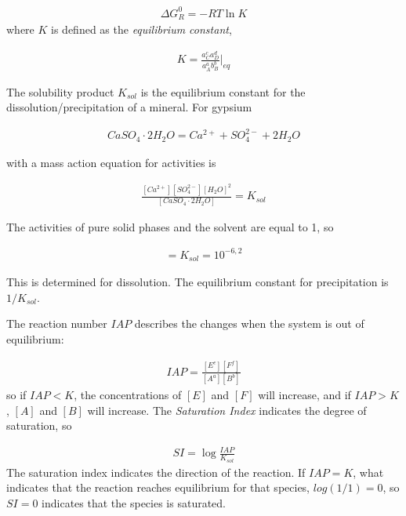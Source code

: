 \documentclass[11pt,twoside]{report}
\begin{document}
\begin{align}
    \Delta G_{R}^{0} = -RT \ln K
\end{align}
where $K$ is defined as the \textit{equilibrium constant}, 

\begin{align}
   K = \frac{a_{C}^{c}a_{D}^{d}}{a_{A}^{a}b_{B}^{b}}|_{eq}
\end{align}

The solubility product $K_{sol}$ is the equilibrium constant for the dissolution/precipitation of a mineral. For gypsium

\begin{align}
   CaSO_{4} \cdot 2H_{2}O = Ca^{2+} + SO_{4}^{2-} + 2H_{2}O
\end{align}

with a mass action equation for activities is 

\begin{align}
   \frac{[Ca^{2+}][SO_{4}^{2-}][H_{2}O]^{2}}{[CaSO_{4} \cdot 2 H_{2}O]} = K_{sol}
\end{align}

The activities of pure solid phases and the solvent are equal to 1, so

\begin{align}
   [Ca^{2+}][SO_{4}^{2-}] = K_{sol} = 10^{-6,2}
\end{align}

This is determined for dissolution. The equilibrium constant for precipitation is $1/K_{sol}$.

The reaction number $IAP$ describes the changes when the system is out of equilibrium:

\begin{align}
IAP = \frac{[E^{e}][F^{f}]}{[A^{a}][B^{b}]}   
\end{align}
so if $IAP < K$, the concentrations of $[E]$ and $[F]$ will increase, and if $IAP > K$, $[A]$ and $[B]$ will increase. The \textit{Saturation Index} indicates the degree of saturation, so

\begin{align}
   SI = \log \frac{IAP}{K_{sol}}
\end{align}
The saturation index indicates the direction of the reaction. If $IAP = K$, what indicates that the reaction reaches equilibrium for that species, $log(1/1) = 0$, so $SI=0$ indicates that the species is saturated.
\end{document}
